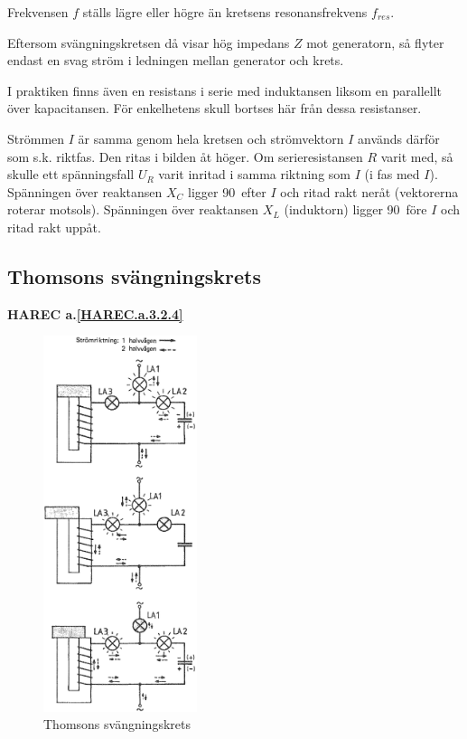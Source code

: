 Frekvensen \(f\) ställs lägre eller högre än kretsens resonansfrekvens
\(f_{res}\).

Eftersom svängningskretsen då visar hög impedans \(Z\) mot generatorn, så
flyter endast en svag ström i ledningen mellan generator och krets.

I praktiken finns även en resistans i serie med induktansen liksom en
parallellt över kapacitansen.
För enkelhetens skull bortses här från dessa resistanser.

Strömmen \(I\) är samma genom hela kretsen och strömvektorn \(I\) används
därför som s.k. riktfas.
Den ritas i bilden åt höger.
Om serieresistansen \(R\) varit med, så skulle ett spänningsfall \(U_R\) varit
inritad i samma riktning som \(I\) (i fas med \(I\)).
Spänningen över reaktansen \(X_C\) ligger 90\degree~efter \(I\) och ritad
rakt neråt (vektorerna roterar motsols).
Spänningen över reaktansen \(X_L\) (induktorn) ligger 90\degree~före \(I\) och
ritad rakt uppåt.

\subsection{Thomsons svängningskrets}
\textbf{HAREC a.\ref{HAREC.a.3.2.4}\label{myHAREC.a.3.2.4}}

\begin{figure}[ht]
\begin{center}
  \includegraphics[width=0.4\textwidth]{images/cropped_pdfs/bild_2_3-17.pdf}
  \caption{Thomsons svängningskrets}
  \label{fig:BildII3-17}
\end{center}
\end{figure}

